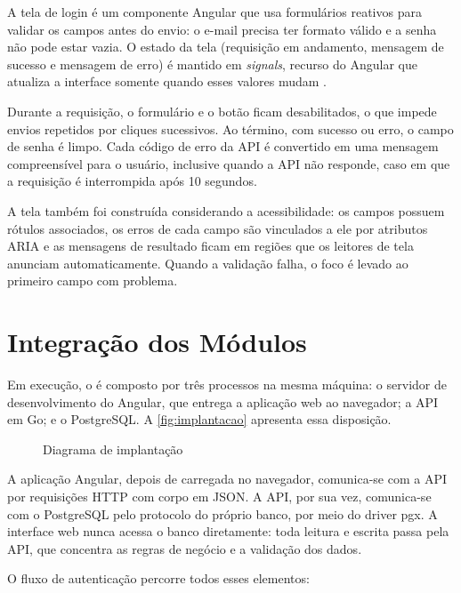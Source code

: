 A tela de login é um componente Angular que usa formulários reativos para validar os campos antes do envio: o e-mail precisa ter formato válido e a senha não pode estar vazia. O estado da tela (requisição em andamento, mensagem de sucesso e mensagem de erro) é mantido em \textit{signals}, recurso do Angular que atualiza a interface somente quando esses valores mudam \cite{angular}.

Durante a requisição, o formulário e o botão ficam desabilitados, o que impede envios repetidos por cliques sucessivos. Ao término, com sucesso ou erro, o campo de senha é limpo. Cada código de erro da API é convertido em uma mensagem compreensível para o usuário, inclusive quando a API não responde, caso em que a requisição é interrompida após 10 segundos.

A tela também foi construída considerando a acessibilidade: os campos possuem rótulos associados, os erros de cada campo são vinculados a ele por atributos ARIA e as mensagens de resultado ficam em regiões que os leitores de tela anunciam automaticamente. Quando a validação falha, o foco é levado ao primeiro campo com problema.

\section{Integração dos Módulos}
\label{sec:integracao}

Em execução, o \sistema{} é composto por três processos na mesma máquina: o servidor de desenvolvimento do Angular, que entrega a aplicação web ao navegador; a API em Go; e o PostgreSQL. A \autoref{fig:implantacao} apresenta essa disposição.

\begin{figure}[htbp]
  \centering
  \caption{Diagrama de implantação}
  \label{fig:implantacao}
  \resizebox{\linewidth}{!}{}
\end{figure}

A aplicação Angular, depois de carregada no navegador, comunica-se com a API por requisições HTTP com corpo em JSON. A API, por sua vez, comunica-se com o PostgreSQL pelo protocolo do próprio banco, por meio do driver pgx. A interface web nunca acessa o banco diretamente: toda leitura e escrita passa pela API, que concentra as regras de negócio e a validação dos dados.

O fluxo de autenticação percorre todos esses elementos:

